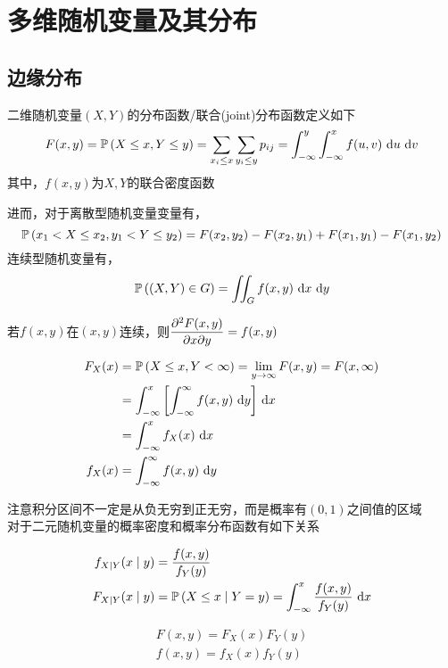 
\section{多维随机变量及其分布}
\subsection{边缘分布}
\begin{definition}
二维随机变量$(X,Y)$的分布函数/联合(joint)分布函数定义如下
\[F(x,y)=\mathbb{P}\left(X\leq x,Y\leq y\right)=\displaystyle\sum_{x_i\leq x}\sum_{y_i\leq y}p_{ij}=\displaystyle\int_{-\infty}^{y}\int_{-\infty}^{x}f(u,v)\,\,\mathrm{d} u\,\,\mathrm{d} v\]
其中，$f(x,y)$为$X,Y$的联合密度函数
\end{definition}
进而，对于离散型随机变量变量有，
\[\mathbb{P}\left(x_1<X\leq x_2,y_1<Y\leq y_2\right)=F(x_2,y_2)-F(x_2,y_1)+F(x_1,y_1)-F(x_1,y_2)\]
连续型随机变量有，
\[\mathbb{P}\left((X,Y)\in G\right)=\iint_G f(x,y)\,\,\mathrm{d} x\,\,\mathrm{d} y\]
\par 若$f(x,y)$在$(x,y)$连续，则$\dfrac{\partial^2 F(x,y)}{\partial x\partial y}=f(x,y)$

\begin{definition}[边缘(marginal)分布]
\[\begin{aligned}
F_X(x)&=\mathbb{P}\left(X\leq x,Y<\infty\right)=\lim_{y\to\infty}F(x,y)=F(x,\infty)\\
&=\displaystyle\int_{-\infty}^{x}{\left[\displaystyle\int_{-\infty}^{\infty}{f(x,y)}\,\,\mathrm{d} y\right]}\,\,\mathrm{d} x\\
&=\displaystyle\int_{-\infty}^{x}{f_X(x)}\,\,\mathrm{d} x\\
f_X(x)&=\displaystyle\int_{-\infty}^{\infty}{f(x,y)}\,\,\mathrm{d} y
\end{aligned}\]
\end{definition}
注意积分区间不一定是从负无穷到正无穷，而是概率有$(0,1)$之间值的区域\\
对于二元随机变量的概率密度和概率分布函数有如下关系
\begin{center}
\end{center}

\begin{definition}[条件概率密度与分布函数]
\[\begin{aligned}
f_{X\mid Y}(x\mid y)&=\dfrac{f(x,y)}{f_Y(y)}\\
F_{X\mid Y}(x\mid y)&=\mathbb{P}\left(X\leq x\mid Y=y\right)=\displaystyle\int_{-\infty}^{x}{\dfrac{f(x,y)}{f_Y(y)}}\,\,\mathrm{d} x
\end{aligned}\]
\end{definition}
\begin{definition}[相互独立]
\[\begin{aligned}
F(x,y)=F_X(x)F_Y(y)\\
f(x,y)=f_X(x)f_Y(y)
\end{aligned}\]
\end{definition}

